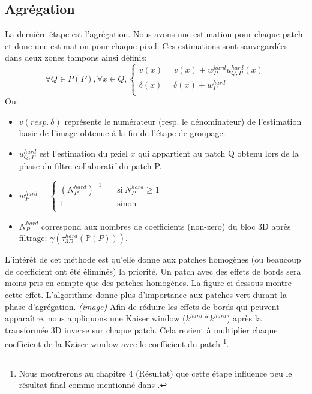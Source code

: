 \subsection{Agrégation}
La dernière étape est l'agrégation. Nous avons une estimation pour chaque patch et donc une estimation pour chaque pixel. Ces estimations sont sauvegardées dans deux zones tampons ainsi définis:
\[ \forall Q \in  P(P), \forall x \in Q, 
  \begin{cases}
    v(x) = v(x) + w^{hard}_P u^{hard}_{Q,P}(x) \\
    \delta(x) = \delta(x) + w^{hard}_P  \\
  \end{cases}
\]
Ou:
\begin{itemize}
\item \(v (resp. \: \delta ) \) représente le numérateur (resp. le dénominateur) de l'estimation basic de l'image obtenue à la fin de l'étape de groupage.
\item \(u^{hard}_{Q,P} \) est l'estimation du pxiel \(x \) qui appartient au patch Q obtenu lors de la phase du filtre collaboratif du patch P.
\item \( w^{hard}_P  = \begin{cases} (N^{hard}_P)^{-1}  & \quad \text{si} \: N^{hard}_P \ge 1 \\ 1  & \quad\text{sinon}\\ \end{cases} \) 
\item \( N^{hard}_P \) correspond aux nombres de coefficients (non-zero) du bloc 3D après filtrage: \(\gamma ( \tau^{hard}_{3D} (\mathbb{P}(P))) \). 
\end{itemize}
\newpage
L'intérêt de cet méthode est qu'elle donne aux patches homogènes (ou beaucoup de coefficient ont été éliminés) la priorité. Un patch avec des effets de bords sera moins pris en compte que des patches homogènes. La figure ci-dessous montre cette effet. L'algorithme donne plus d'importance aux patches vert durant la phase d'agrégation.
\newline
\newline
\textit{\small{(image)}}
\newline
\newline
Afin de réduire les effets de bords qui peuvent apparaître, nous appliquons une Kaiser window (\( k^{hard} * k^{hard}\)) après la transformée 3D inverse sur chaque patch. Cela revient à multiplier chaque coefficient de la Kaiser window avec le coefficient du patch \footnote{Nous montrerons au chapitre 4 (Résultat) que cette étape influence peu le résultat final comme mentionné dans \cite{2}.}.  
